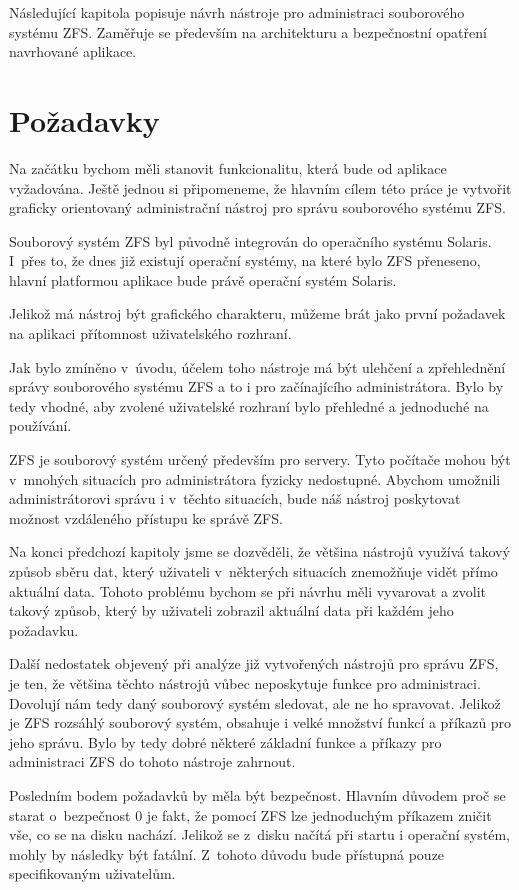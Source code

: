 Následující kapitola popisuje návrh nástroje pro administraci souborového systému ZFS. Zaměřuje se především na architekturu a bezpečnostní opatření navrhované aplikace.
\section{Požadavky}
Na začátku bychom měli stanovit funkcionalitu, která bude od aplikace vyžadována. Ještě jednou si připomeneme, že hlavním cílem této práce je vytvořit graficky orientovaný administrační nástroj pro správu souborového systému ZFS.

Souborový systém ZFS byl původně integrován do operačního systému Solaris. I~přes to, že dnes již existují operační systémy, na které bylo ZFS přeneseno, hlavní platformou aplikace bude právě operační systém Solaris.

Jelikož má nástroj být grafického charakteru, můžeme brát jako první požadavek na aplikaci přítomnost uživatelského rozhraní.

Jak bylo zmíněno v~úvodu, účelem toho nástroje má být ulehčení a zpřehlednění správy souborového systému ZFS a to i pro začínajícího administrátora. Bylo by tedy vhodné, aby zvolené uživatelské rozhraní bylo přehledné a jednoduché na používání.

ZFS je souborový systém určený především pro servery. Tyto počítače mohou být v~mnohých situacích pro administrátora fyzicky nedostupné. Abychom umožnili administrátorovi správu i v~těchto situacích, bude náš nástroj poskytovat možnost vzdáleného přístupu ke správě ZFS.

Na konci předchozí kapitoly jsme se dozvěděli, že většina nástrojů využívá takový způsob sběru dat, který uživateli v~některých situacích znemožňuje vidět přímo aktuální data. Tohoto problému bychom se při návrhu měli vyvarovat a zvolit takový způsob, který by uživateli zobrazil aktuální data při každém jeho požadavku.

Další nedostatek objevený při analýze již vytvořených nástrojů pro správu ZFS, je ten, že většina těchto nástrojů vůbec neposkytuje funkce pro administraci. Dovolují nám tedy daný souborový systém sledovat, ale ne ho spravovat. Jelikož je ZFS rozsáhlý souborový systém, obsahuje i velké množství funkcí a příkazů pro jeho správu. Bylo by tedy dobré některé základní funkce a příkazy pro administraci ZFS do tohoto nástroje zahrnout.

Posledním bodem požadavků by měla být bezpečnost. Hlavním důvodem proč se starat o~bezpečnost 0 je fakt, že pomocí ZFS lze jednoduchým příkazem zničit vše, co se na disku nachází. Jelikož se z~disku načítá při startu i operační systém, mohly by následky být fatální. Z~tohoto důvodu bude přístupná pouze specifikovaným uživatelům.


